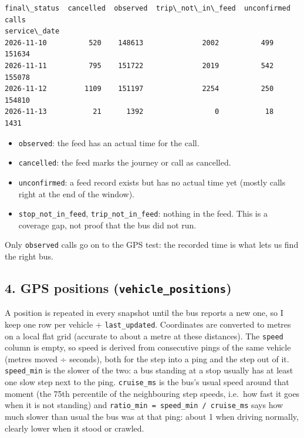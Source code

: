 \documentclass[11pt]{article}
\providecommand{\tightlist}{%
      \setlength{\itemsep}{0pt}\setlength{\parskip}{0pt}}
\begin{document}
    
    
    \begin{Verbatim}[commandchars=\\\{\}]
final\_status  cancelled  observed  trip\_not\_in\_feed  unconfirmed   calls
service\_date                                                            
2026-11-10          520    148613              2002          499  151634
2026-11-11          795    151722              2019          542  155078
2026-11-12         1109    151197              2254          250  154810
2026-11-13           21      1392                 0           18    1431
    \end{Verbatim}

    
    \begin{itemize}
\tightlist
\item
  \texttt{observed}: the feed has an actual time for the call.
\item
  \texttt{cancelled}: the feed marks the journey or call as cancelled.
\item
  \texttt{unconfirmed}: a feed record exists but has no actual time yet
  (mostly calls right at the end of the window).
\item
  \texttt{stop\_not\_in\_feed}, \texttt{trip\_not\_in\_feed}: nothing in
  the feed. This is a coverage gap, not proof that the bus did not run.
\end{itemize}

Only \texttt{observed} calls go on to the GPS test: the recorded time is
what lets us find the right bus.

    \subsection{\texorpdfstring{4. GPS positions
(\texttt{vehicle\_positions})}{4. GPS positions (vehicle\_positions)}}\label{gps-positions-vehicle_positions}

A position is repeated in every snapshot until the bus reports a new
one, so I keep one row per vehicle + \texttt{last\_updated}. Coordinates
are converted to metres on a local flat grid (accurate to about a metre
at these distances). The \texttt{speed} column is empty, so speed is
derived from consecutive pings of the same vehicle (metres moved ÷
seconds), both for the step into a ping and the step out of it.
\texttt{speed\_min} is the slower of the two: a bus standing at a stop
usually has at least one slow step next to the ping. \texttt{cruise\_ms}
is the bus's usual speed around that moment (the 75th percentile of the
neighbouring step speeds, i.e.~how fast it goes when it is not standing)
and \texttt{ratio\_min\ =\ speed\_min\ /\ cruise\_ms} says how much
slower than usual the bus was at that ping: about 1 when driving
normally, clearly lower when it stood or crawled.
\end{document}
